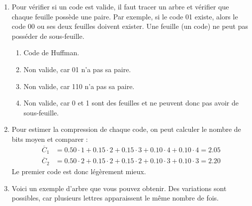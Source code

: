 \documentclass [a4paper, 11pt] {article}
\begin{document}
    \begin{reponse}
        \begin{enumerate}
            \item Pour vérifier si un code est valide, il faut tracer un arbre et vérifier que chaque feuille possède une paire. Par exemple, si le code 01 existe, alors le code 00 ou ses deux feuilles doivent exister. Une feuille (un code) ne peut pas posséder de sous-feuille.
            \begin{enumerate}
                \item Code de Huffman.
                \item Non valide, car 01 n'a pas sa paire.
                \item Non valide, car 110 n'a pas sa paire.
                \item Non valide, car 0 et 1 sont des feuilles et ne peuvent donc pas avoir de sous-feuille.
            \end{enumerate}
            \item Pour estimer la compression de chaque code, on peut calculer le nombre de bits moyen et comparer :
            \begin{align*}
                \overline{C}_1 &= 0.50 \cdot 1 + 0.15 \cdot 2 + 0.15 \cdot 3 + 0.10 \cdot 4 + 0.10 \cdot 4 = 2.05\\
                \overline{C}_2 &= 0.50 \cdot 2 + 0.15 \cdot 2 + 0.15 \cdot 2 + 0.10 \cdot 3 + 0.10 \cdot 3 = 2.20
            \end{align*}
            Le premier code est donc légèrement mieux.
            \item Voici un exemple d'arbre que vous pouvez obtenir. Des variations sont possibles, car plusieurs lettres apparaissent le même nombre de fois.
            \begin{center}
\end{center}
\end{enumerate}
\end{reponse}
\end{document}
